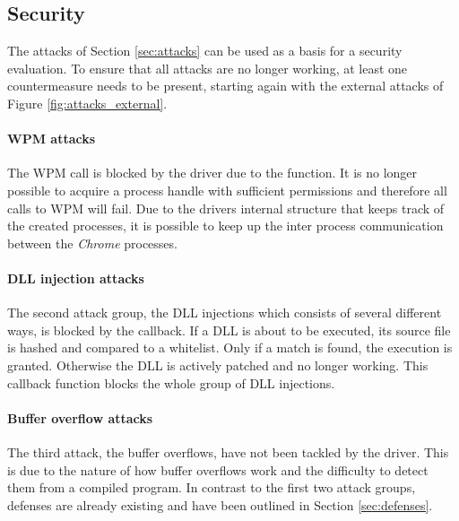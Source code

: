 \subsection{Security}
The attacks of Section \ref{sec:attacks} can be used as a basis for a security evaluation. To ensure that all attacks are no longer working, at least one countermeasure needs to be present, starting again with the external attacks of Figure \ref{fig:attacks_external}. 

\paragraph{\gls{WPM} attacks}
The \gls{WPM} call is blocked by the driver due to the  function. It is no longer possible to acquire a process handle with sufficient permissions and therefore all calls to \gls{WPM} will fail. Due to the drivers internal structure that keeps track of the created processes, it is possible to keep up the inter process communication between the \emph{Chrome} processes. 

\paragraph{\gls{DLL} injection attacks}
The second attack group, the \gls{DLL} injections which consists of several different ways, is blocked by the  callback. If a \gls{DLL} is about to be executed, its source file is hashed and compared to a whitelist. Only if a match is found, the execution is granted. Otherwise the \gls{DLL} is actively patched and no longer working. This callback function blocks the whole group of \gls{DLL} injections.

\paragraph{Buffer overflow attacks}
The third attack, the buffer overflows, have not been tackled by the driver. This is due to the nature of how buffer overflows work and the difficulty to detect them from a compiled program. In contrast to the first two attack groups, defenses are already existing and have been outlined in Section \ref{sec:defenses}.

